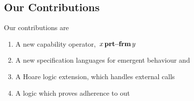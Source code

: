 %

\subsection{Our Contributions}

Our contributions are

\begin{enumerate}
\item
A new capability operator, ${\, x\, \mathbf{prt\!\!-\!\!frm}\, y}$ 
\item
A new specification languages for emergent behaviour and
\item
A Hoare logic extension, which handles external calls
\item
A logic which proves adherence to out 
\end{enumerate}

 
